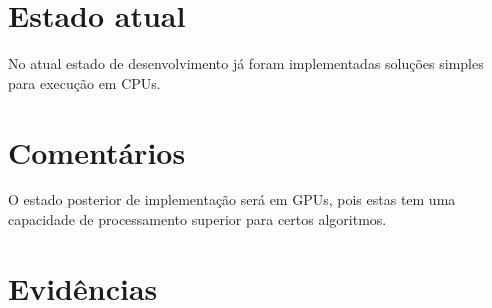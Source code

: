\documentclass[a4paper, 12pt]{article}
\begin{document}
\section{Estado atual}

	No atual estado de desenvolvimento já foram implementadas soluções simples
para execução em CPUs.

\section{Comentários}

	O estado posterior de implementação será em GPUs, pois estas tem uma
capacidade de processamento superior para certos algoritmos.


\section{Evidências}

%
%
%
\end{document}

